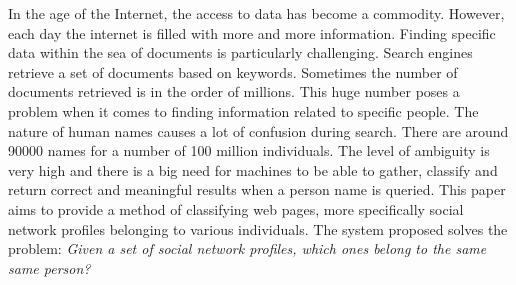 
In the age of the Internet, the access to data has become a commodity. However,
each day the internet is filled with more and more information. Finding specific
data within the sea of documents is particularly challenging. Search engines
retrieve a set of documents based on keywords. Sometimes the number of documents
retrieved is in the order of millions. This huge number poses a problem when it
comes to finding information related to specific people. The nature of human 
names causes a lot of confusion during search. There are around 90000 names for 
a number of 100 million individuals. The level of ambiguity is very high and 
there is a big need for machines to be able to gather, classify and return 
correct and meaningful results when a person name is queried. This paper aims to 
provide a method of classifying web pages, more specifically social network
profiles belonging to various individuals. The system proposed solves the problem:
\em{Given a set of social network profiles, which ones belong to the same
same person?}



